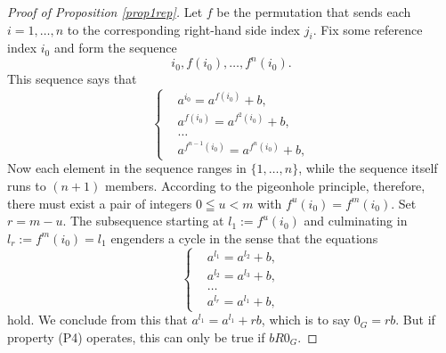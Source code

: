 \documentclass[pdflatex,sn-apa,11pt]{sn-jnl}%
\begin{document}
\begin{proof}[Proof of Proposition \ref{prop1rep}]
Let $f$ be the permutation that sends each $i = 1, \dots, n$ to the corresponding right-hand side index $j_i$. Fix some reference index $i_0$ and form the sequence \begin{equation*}i_0, f(i_0), \dots, f^{n}(i_0).\end{equation*} This sequence says that \begin{equation*}
  \left\{
    \begin{aligned}
      & a^{i_0} = a^{f(i_0)} + b, \\
      & a^{f(i_0)} = a^{f^2(i_0)} + b, \\
      & \dots \\
      & a^{f^{n-1}(i_0)} = a^{f^{n}(i_0)} + b,
    \end{aligned}
  \right.
\end{equation*}
Now each element in the sequence ranges in $\{1, \dots, n\}$, while the sequence itself runs to $(n+1)$ members. According to the pigeonhole principle, therefore, there must exist a pair of integers $0 \leqq u < m$ with $f^{u}(i_0) = f^{m}(i_0)$. Set $r = m-u$. The subsequence starting at $l_1 := f^{u}(i_0)$ and culminating in $l_r := f^{m}(i_0) = l_1$ engenders a cycle in the sense that the equations\begin{equation*}
  \left\{
    \begin{aligned}
      & a^{l_1} = a^{l_2} + b, \\
      & a^{l_2} = a^{l_3} + b, \\
      & \dots \\
      & a^{l_r} = a^{l_1} + b,
    \end{aligned}
  \right.
\end{equation*}
hold. We conclude from this that $a^{l_1} = a^{l_1} + rb$, which is to say $0_G = rb$. But if property (P4) operates, this can only be true if $bR0_G$.

\end{proof}
\end{document}
